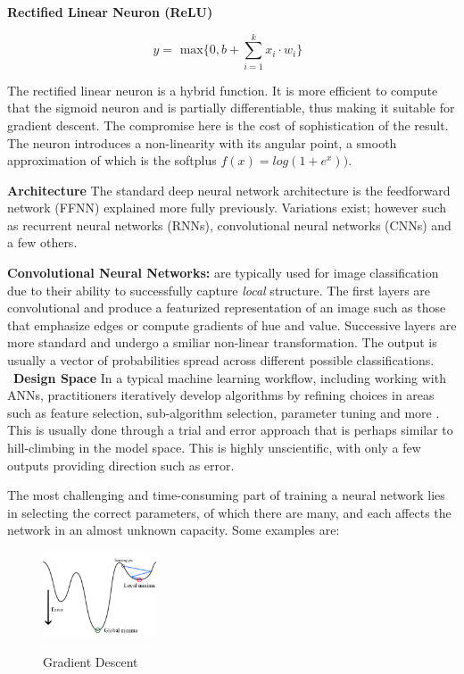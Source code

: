 \documentclass[a4paper,11pt,titlepage]{article}
\begin{document}
		\textbf{Rectified Linear Neuron (ReLU) }
		
		$$
		y = 
		\text{ max$\{0,  b + \sum\limits_{i=1}^k x_{i} \cdot w_{i}\}$ }	
		$$		
		
		The rectified linear neuron is a hybrid function. It is more efficient to compute that the sigmoid neuron and is partially differentiable, thus making it suitable for gradient descent. The compromise here is the cost of sophistication of the result. The neuron introduces a non-linearity with its angular point, a smooth approximation of which is the softplus $f(x) = log(1 + e^{x}))$.
		
\textbf{Architecture}
		The standard deep neural network architecture is the feedforward network (FFNN) explained more fully previously. Variations exist; however such as recurrent neural networks (RNNs), convolutional neural networks (CNNs) and a few others. 
				
\textbf{Convolutional Neural Networks:}
		are typically used for image classification due to their ability to successfully capture \textit{local} structure. The first layers are convolutional and produce a featurized representation of an image such as those that emphasize edges or compute gradients of hue and value. Successive layers are more standard and undergo a smiliar non-linear transformation. The output is usually a vector of probabilities spread across different possible classifications.
		\\\
		\textbf{Design Space}
		In a typical machine learning workflow, including working with ANNs, practitioners iteratively develop algorithms by refining choices in areas such as feature selection, sub-algorithm selection, parameter tuning and more \cite{Patel2008}. This is usually done through a trial and error approach that is perhaps similar to hill-climbing in the model space. This is highly unscientific, with only a few outputs providing direction such as error.
		\par 
		The most challenging and time-consuming part of training a neural network lies in selecting the correct parameters, of which there are many, and each affects the network in an almost unknown capacity. Some examples are:
				
		\begin{figure}[H]
    			\centering	
			{{\includegraphics[width=0.3\textwidth]
    				{img/gradient_descent.png} 
    			}}%
    			\caption{Gradient Descent}%
    			\label{fig:GradDesc}
		\end{figure}		
		 		
\end{document}
